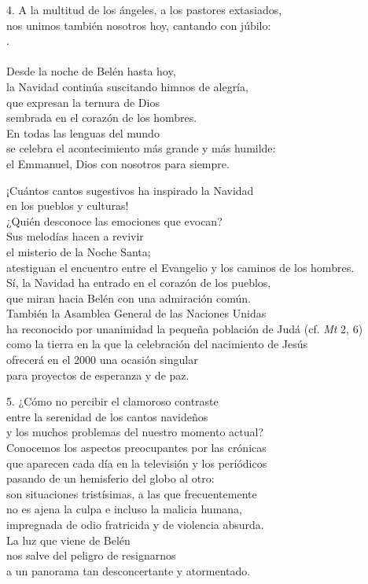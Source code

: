4. A la multitud de los ángeles, a los pastores extasiados,\\ nos unimos también nosotros hoy, cantando con júbilo:\\ .\\ \\ Desde la noche de Belén hasta hoy,\\ la Navidad continúa suscitando himnos de alegría,\\ que expresan la ternura de Dios\\ sembrada en el corazón de los hombres.\\ En todas las lenguas del mundo\\ se celebra el acontecimiento más grande y más humilde:\\ el Emmanuel, Dios con nosotros para siempre.

¡Cuántos cantos sugestivos ha inspirado la Navidad\\ en los pueblos y culturas!\\ ¿Quién desconoce las emociones que evocan?\\ Sus melodías hacen a revivir\\ el misterio de la Noche Santa;\\ atestiguan el encuentro entre el Evangelio y los caminos de los hombres.\\ Sí, la Navidad ha entrado en el corazón de los pueblos,\\ que miran hacia Belén con una admiración común.\\ También la Asamblea General de las Naciones Unidas\\ ha reconocido por unanimidad la pequeña población de Judá (cf. \emph{Mt} 2, 6)\\ como la tierra en la que la celebración del nacimiento de Jesús\\ ofrecerá en el 2000 una ocasión singular\\ para proyectos de esperanza y de paz.

5. ¿Cómo no percibir el clamoroso contraste\\ entre la serenidad de los cantos navideños\\ y los muchos problemas del nuestro momento actual?\\ Conocemos los aspectos preocupantes por las crónicas\\ que aparecen cada día en la televisión y los periódicos\\ pasando de un hemisferio del globo al otro:\\ son situaciones tristísimas, a las que frecuentemente\\ no es ajena la culpa e incluso la malicia humana,\\ impregnada de odio fratricida y de violencia absurda.\\ La luz que viene de Belén\\ nos salve del peligro de resignarnos\\ a un panorama tan desconcertante y atormentado.

